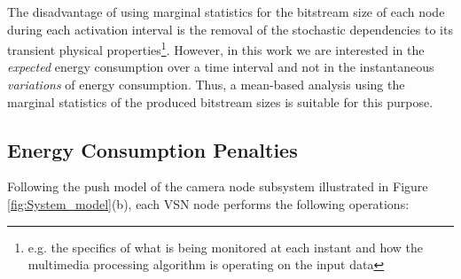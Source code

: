 \documentclass[twocolumn,english]{IEEEtran}
\theoremstyle{plain}
\theoremstyle{definition}
\begin{document}
The disadvantage of using marginal statistics for the bitstream size
of each node during each activation interval is the removal of the
stochastic dependencies to its transient physical properties\footnote{e.g. the specifics of what is being monitored at each instant and
how the multimedia processing algorithm is operating on the input
data}. However, in this work we are interested in the \emph{expected} energy
consumption over a time interval and not in the instantaneous \emph{variations}
of energy consumption. Thus, a mean-based analysis using the marginal
statistics of the produced bitstream sizes is suitable for this purpose.


\subsection{Energy Consumption Penalties}

Following the push model of the camera node subsystem illustrated
in Figure \ref{fig:System_model}(b), each VSN node performs the following
operations:
\end{document}
